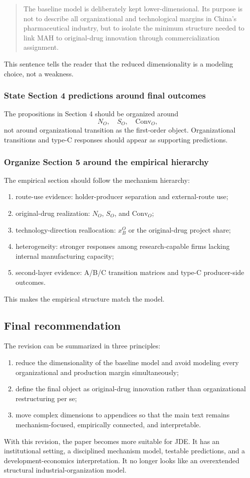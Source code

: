 \documentclass[12pt]{article}
\newcommand{\Conv}{\mathrm{Conv}}
\begin{document}
\begin{quote}
The baseline model is deliberately kept lower-dimensional. Its purpose is not to describe all organizational and technological margins in China's pharmaceutical industry, but to isolate the minimum structure needed to link MAH to original-drug innovation through commercialization assignment.
\end{quote}

This sentence tells the reader that the reduced dimensionality is a modeling choice, not a weakness.

\subsubsection{State Section 4 predictions around final outcomes}

The propositions in Section 4 should be organized around
\[
N_O,\quad S_O,\quad \Conv_O,
\]
not around organizational transition as the first-order object. Organizational transitions and type-C responses should appear as supporting predictions.

\subsubsection{Organize Section 5 around the empirical hierarchy}

The empirical section should follow the mechanism hierarchy:
\begin{enumerate}
    \item route-use evidence: holder-producer separation and external-route use;
    \item original-drug realization: $N_O$, $S_O$, and $\Conv_O$;
    \item technology-direction reallocation: $x_B^O$ or the original-drug project share;
    \item heterogeneity: stronger responses among research-capable firms lacking internal manufacturing capacity;
    \item second-layer evidence: A/B/C transition matrices and type-C producer-side outcomes.
\end{enumerate}

This makes the empirical structure match the model.

\subsection{Final recommendation}

The revision can be summarized in three principles:
\begin{enumerate}
    \item reduce the dimensionality of the baseline model and avoid modeling every organizational and production margin simultaneously;
    \item define the final object as original-drug innovation rather than organizational restructuring per se;
    \item move complex dimensions to appendices so that the main text remains mechanism-focused, empirically connected, and interpretable.
\end{enumerate}

With this revision, the paper becomes more suitable for JDE. It has an institutional setting, a disciplined mechanism model, testable predictions, and a development-economics interpretation. It no longer looks like an overextended structural industrial-organization model.
\end{document}
